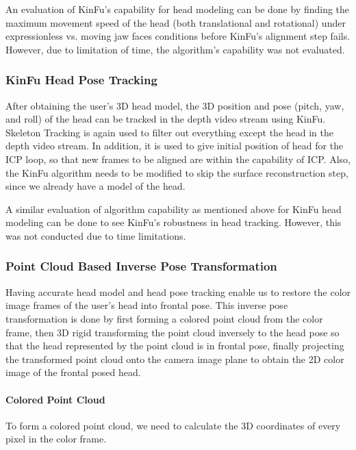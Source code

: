 An evaluation of KinFu's capability for head modeling can be done by finding the maximum movement speed of the head (both translational and rotational) under expressionless vs. moving jaw faces conditions before KinFu's alignment step fails.  However, due to limitation of time, the algorithm's capability was not evaluated.


\subsubsection{KinFu Head Pose Tracking}
After obtaining the user's 3D head model, the 3D position and pose (pitch, yaw, and roll) of the head can be tracked in the depth video stream using KinFu.  Skeleton Tracking is again used to filter out everything except the head in the depth video stream.  In addition, it is used to give initial position of head for the ICP loop, so that new frames to be aligned are within the capability of ICP.  Also, the KinFu algorithm needs to be modified to skip the surface reconstruction step, since we already have a model of the head.

A similar evaluation of algorithm capability as mentioned above for KinFu head modeling can be done to see KinFu's robustness in head tracking.  However, this was not conducted due to time limitations.


\subsubsection{Point Cloud Based Inverse Pose Transformation}
Having accurate head model and head pose tracking enable us to restore the color image frames of the user's head into frontal pose.  This inverse pose transformation is done by first forming a colored point cloud from the color frame, then 3D rigid transforming the point cloud inversely to the head pose so that the head represented by the point cloud is in frontal pose, finally projecting the transformed point cloud onto the camera image plane to obtain the 2D color image of the frontal posed head.

\paragraph{Colored Point Cloud}
To form a colored point cloud, we need to calculate the 3D coordinates of every pixel in the color frame.

